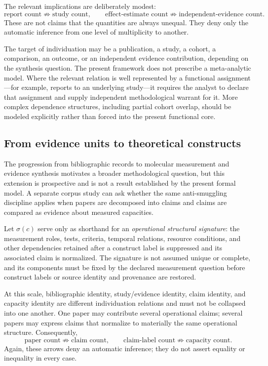 \documentclass[11pt]{article}
\begin{document}
The relevant implications are deliberately modest:
\[
\text{report count}
\not\Rightarrow
\text{study count},
\qquad
\text{effect-estimate count}
\not\Rightarrow
\text{independent-evidence count}.
\]
These are not claims that the quantities are always unequal. They deny only the automatic inference from one level of multiplicity to another.

The target of individuation may be a publication, a study, a cohort, a comparison, an outcome, or an independent evidence contribution, depending on the synthesis question. The present framework does not prescribe a meta-analytic model. Where the relevant relation is well represented by a functional assignment---for example, reports to an underlying study---it requires the analyst to declare that assignment and supply independent methodological warrant for it. More complex dependence structures, including partial cohort overlap, should be modeled explicitly rather than forced into the present functional core.

\subsection{From evidence units to theoretical constructs}

The progression from bibliographic records to molecular measurement and evidence synthesis motivates a broader methodological question, but this extension is prospective and is not a result established by the present formal model. A separate corpus study can ask whether the same anti-smuggling discipline applies when papers are decomposed into claims and claims are compared as evidence about measured capacities.

Let \(\sigma(c)\) serve only as shorthand for an \emph{operational structural signature}: the measurement roles, tests, criteria, temporal relations, resource conditions, and other dependencies retained after a construct label is suppressed and its associated claim is normalized. The signature is not assumed unique or complete, and its components must be fixed by the declared measurement question before construct labels or source identity and provenance are restored.

At this scale, bibliographic identity, study/evidence identity, claim identity, and capacity identity are different individuation relations and must not be collapsed into one another. One paper may contribute several operational claims; several papers may express claims that normalize to materially the same operational structure. Consequently,
\[
\text{paper count}
\not\Rightarrow
\text{claim count},
\qquad
\text{claim-label count}
\not\Rightarrow
\text{capacity count}.
\]
Again, these arrows deny an automatic inference; they do not assert equality or inequality in every case.
\end{document}
